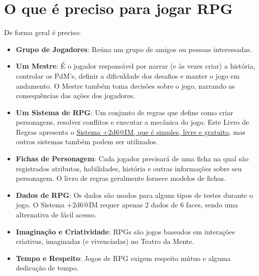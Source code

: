 \section{\label{sec:necessario}O que é preciso para jogar RPG}
De forma geral é preciso:
\begin{itemize}
	\item \textbf{Grupo de Jogadores}: Reúna um grupo de amigos ou pessoas interessadas.
	\item \textbf{Um Mestre}: É o jogador responsável por narrar (e às vezes criar) a história, controlar os PdM's, definir a dificuldade dos desafios e manter o jogo em andamento. O Mestre também toma decisões sobre o jogo, narrando as consequências das ações dos jogadores.
	\item \textbf{Um Sistema de RPG}: Um conjunto de regras que define como criar personagens, resolver conflitos e executar a mecânica do jogo. Este Livro de Regras apresenta o \underline{Sistema +2d6@IM, que é simples, livre e gratuito}, mas outros sistemas também podem ser utilizados. 
	\item \textbf{Fichas de Personagem}: Cada jogador precisará de uma ficha na qual são registrados atributos, habilidades, história e outras informações sobre seu personagem. O livro de regras geralmente fornece modelos de fichas.
	\item \textbf{Dados de RPG}: Os dados são usados para alguns tipos de testes durante o jogo. O Sistema +2d6@IM requer apenas 2 dados de 6 faces, sendo uma alternativa de fácil acesso.
	\item \textbf{Imaginação e Criatividade}: RPGs são jogos baseados em interações criativas, imaginadas (e vivenciadas) no Teatro da Mente.
	\item \textbf{Tempo e Respeito}: Jogos de RPG exigem respeito mútuo e alguma dedicação de tempo.
\end{itemize}


